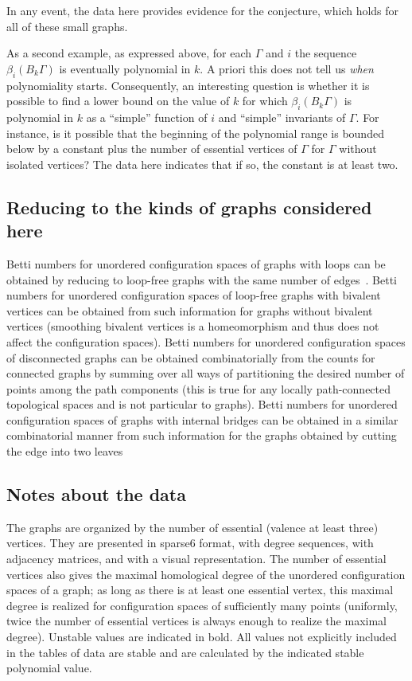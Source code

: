 \documentclass{amsart}
\theoremstyle{definition}
\begin{document}
In any event, the data here provides evidence for the conjecture, which holds for all of these small graphs.

As a second example, as expressed above, for each $\Gamma$ and $i$ the sequence $\beta_i(B_k\Gamma)$ is eventually polynomial in $k$. 
A priori this does not tell us \emph{when} polynomiality starts. 
Consequently, an interesting question is whether it is possible to find a lower bound on the value of $k$ for which $\beta_i(B_k\Gamma)$ is polynomial in $k$ as a ``simple'' function of $i$ and ``simple'' invariants of $\Gamma$. 
For instance, is it possible that the beginning of the polynomial range is bounded below by a constant plus the number of essential vertices of $\Gamma$ for $\Gamma$ without isolated vertices?
The data here indicates that if so, the constant is at least two.

\subsection*{Reducing to the kinds of graphs considered here}
Betti numbers for unordered configuration spaces of graphs with loops can be obtained by reducing to loop-free graphs with the same number of edges~\cite[Lemma 4.6]{AnDrummondColeKnudsen:ESHGBG}. 
Betti numbers for unordered configuration spaces of loop-free graphs with bivalent vertices can be obtained from such information for graphs without bivalent vertices (smoothing bivalent vertices is a homeomorphism and thus does not affect the configuration spaces). 
Betti numbers for unordered configuration spaces of disconnected graphs can be obtained combinatorially from the counts for connected graphs by summing over all ways of partitioning the desired number of points among the path components (this is true for any locally path-connected topological spaces and is not particular to graphs). 
Betti numbers for unordered configuration spaces of graphs with internal bridges can be obtained in a similar combinatorial manner from such information for the graphs obtained by cutting the edge into two leaves~\cite[Proposition 5.22]{AnDrummond-ColeKnudsen:SSGBG}

\subsection*{Notes about the data}
The graphs are organized by the number of essential (valence at least three) vertices. 
They are presented in sparse6 format, with degree sequences, with adjacency matrices, and with a visual representation.
The number of essential vertices also gives the maximal homological degree of the unordered configuration spaces of a graph; as long as there is at least one essential vertex, this maximal degree is realized for configuration spaces of sufficiently many points (uniformly, twice the number of essential vertices is always enough to realize the maximal degree).
Unstable values are indicated in bold.
All values not explicitly included in the tables of data are stable and are calculated by the indicated stable polynomial value.
\end{document}
